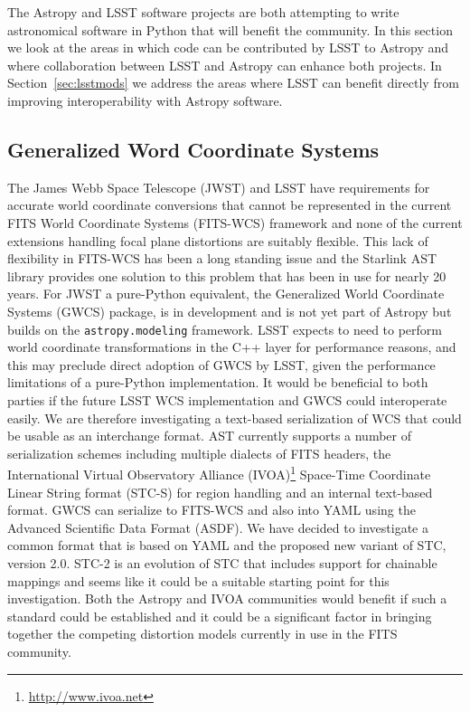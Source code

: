 \documentclass[]{spie}  %
\begin{document}
The Astropy and LSST software projects are both attempting to write astronomical software in Python that will benefit the community.
In this section we look at the areas in which code can be contributed by LSST to Astropy and where collaboration between LSST and Astropy can enhance both projects.
In Section~\ref{sec:lsstmods} we address the areas where LSST can benefit directly from improving interoperability with Astropy software.

\subsection{Generalized Word Coordinate Systems}

The James Webb Space Telescope (JWST)\cite{2006SSRv..123..485G} and LSST have requirements for accurate world coordinate conversions that cannot be represented in the current FITS World Coordinate Systems (FITS-WCS) framework\cite{2013ASPC..475...49H,2002A&A...395.1077C,2015A&C....12..133T} and none of the current extensions handling focal plane distortions\cite{2012SPIE.8451E..1MS,2012tpv} are suitably flexible.
This lack of flexibility in FITS-WCS has been a long standing issue and the Starlink AST library\cite{Berry201633} provides one solution to this problem that has been in use for nearly 20 years.
For JWST a pure-Python equivalent, the Generalized World Coordinate Systems (GWCS) package, is in development\cite{2016_P028_adassxxv} and is not yet part of Astropy but builds on the \texttt{astropy.modeling} framework.
LSST expects to need to perform world coordinate transformations in the C++ layer for performance reasons, and this may preclude direct adoption of GWCS by LSST, given the performance limitations of a pure-Python implementation.
It would be beneficial to both parties if the future LSST WCS implementation and GWCS could interoperate easily.
We are therefore investigating a text-based serialization of WCS that could be usable as an interchange format.
AST currently supports a number of serialization schemes including multiple dialects of FITS headers, the International Virtual Observatory Alliance (IVOA)\footnote{\url{http://www.ivoa.net}} Space-Time Coordinate Linear String format (STC-S)\cite{2007ivoa.spec.1030R} for region handling\cite{2010ASPC..434..213B} and an internal text-based format.
GWCS can serialize to FITS-WCS and also into YAML\cite{2009yaml} using the Advanced Scientific Data Format (ASDF)\cite{2015A&C....12..240G}.
We have decided to investigate a common format that is based on YAML and the proposed new variant of STC, version 2.0.
STC-2\cite{2015ivoaSTC2} is an evolution of STC that includes support for chainable mappings and seems like it could be a suitable starting point for this investigation.
Both the Astropy and IVOA communities would benefit if such a standard could be established and it could be a significant factor in bringing together the competing distortion models currently in use in the FITS community.
\end{document}
